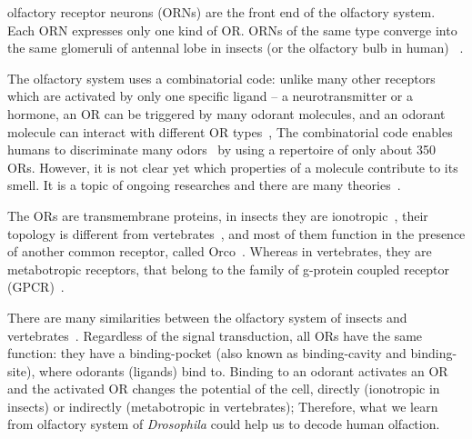 \documentclass[11pt]{paper} %
\begin{document}
olfactory receptor neurons (ORNs) are  the front end of the olfactory system.
Each ORN expresses only one kind of OR. 
ORNs of the same type converge into the same glomeruli of antennal lobe in insects (or the olfactory bulb in human)
~\cite{root2007,Carey2011,Vosshall2000,Couto2005,fishilevich2005,gao2000,wang1998,mombaerts1996,vassar1994}.

The olfactory system uses a combinatorial code: 
unlike many other receptors which are activated by only one specific ligand -- a neurotransmitter or a hormone,
an OR can be triggered by many odorant molecules, 
and an odorant molecule can interact with different OR types~\cite{Malnic2000},
The combinatorial code enables humans to discriminate many odors~\cite{Bushdid2014} by using a repertoire of only about 350 ORs.
However, it is not clear yet which properties of a molecule contribute to its smell. 
It is a topic of ongoing researches and there are many theories~\cite{Turin,Keller2004,Araneda2000,Brookes2007,Franco2011,Pelz2006,Gabler2013,Schmuker2007,Haddad2008,Snitz2013,Yablonka2012,gane2013,
turin2015plausibility,block2015implausibility,vosshall2015laying}.

The ORs are transmembrane proteins, 
in insects they are ionotropic~\cite{Sato2008,Wicher2008,Nagel2011,Rong2011}, 
their topology is different from vertebrates~\cite{Benton2006,Smart2008},
and most of them function in the presence of another common receptor, called Orco~\cite{Larsson2004}.
Whereas in vertebrates, they are metabotropic receptors, that belong to the family of g-protein coupled receptor (GPCR)~\cite{Buck1991,niimura2009evolutionary}. 

There are many similarities between the olfactory system of insects and vertebrates~\cite{Wilson2014,Kaupp2010}.
Regardless of the signal transduction, 
all ORs have the same function: they have a binding-pocket (also known as binding-cavity and binding-site),
where odorants (ligands) bind to. 
Binding to an odorant activates an OR and 
the activated OR changes the potential of the cell, 
directly (ionotropic in insects) or indirectly (metabotropic in vertebrates);
Therefore, what we learn from olfactory system of \textit{Drosophila} could help us to decode human olfaction. 
\end{document}
